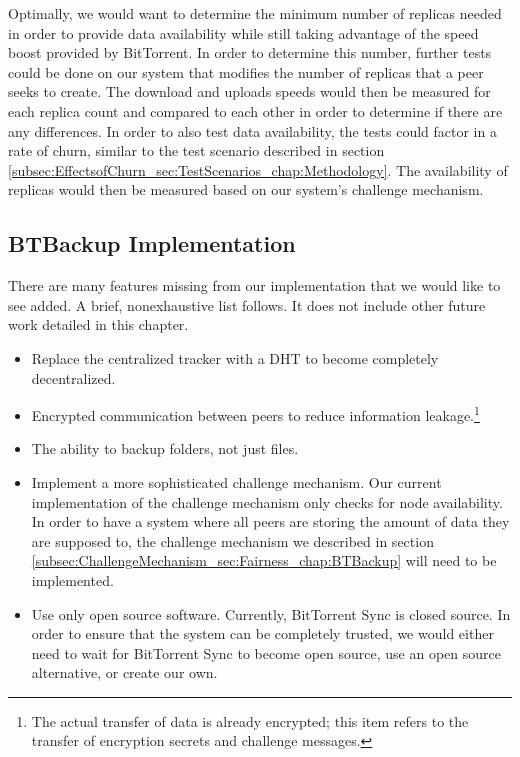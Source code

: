 \documentclass[12pt]{report}
\begin{document}
Optimally, we would want to determine the minimum number of replicas needed in order to provide data availability while still taking advantage of the speed boost provided by BitTorrent. In order to determine this number, further tests could be done on our system that modifies the number of replicas that a peer seeks to create. The download and uploads speeds would then be measured for each replica count and compared to each other in order to determine if there are any differences. In order to also test data availability, the tests could factor in a rate of churn, similar to the test scenario described in section \ref{subsec:EffectsofChurn_sec:TestScenarios_chap:Methodology}. The availability of replicas would then be measured based on our system's challenge mechanism.

\subsection{BTBackup Implementation}

There are many features missing from our implementation that we would like to see added. A brief, nonexhaustive list follows. It does not include other future work detailed in this chapter.

\begin{itemize}
    \item Replace the centralized tracker with a DHT to become completely decentralized.
    \item Encrypted communication between peers to reduce information leakage.\footnote{The actual transfer of data is already encrypted; this item refers to the transfer of encryption secrets and challenge messages.}
    \item The ability to backup folders, not just files.
    \item Implement a more sophisticated challenge mechanism. Our current implementation of the challenge mechanism only checks for node availability. In order to have a system where all peers are storing the amount of data they are supposed to, the challenge mechanism we described in section \ref{subsec:ChallengeMechanism_sec:Fairness_chap:BTBackup} will need to be implemented.
    \item Use only open source software. Currently, BitTorrent Sync is closed source. In order to ensure that the system can be completely trusted, we would either need to wait for BitTorrent Sync to become open source, use an open source alternative, or create our own.
\end{itemize}
\end{document}
